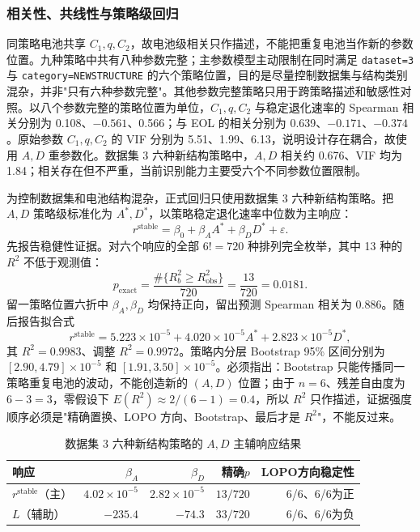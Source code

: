 \documentclass[withoutpreface]{cumcmthesis}
\begin{document}
\subsubsection{相关性、共线性与策略级回归}

同策略电池共享 $C_1,q,C_2$，故电池级相关只作描述，不能把重复电池当作新的参数位置。九种策略中共有八种参数完整；主参数模型主动限制在同时满足 \texttt{dataset=3} 与 \texttt{category=NEWSTRUCTURE} 的六个策略位置，目的是尽量控制数据集与结构类别混杂，并非"只有六种参数完整"。其他参数完整策略只用于跨策略描述和敏感性对照。以八个参数完整的策略位置为单位，$C_1,q,C_2$ 与稳定退化速率的 Spearman 相关分别为 0.108、$-0.561$、0.566；与 EOL 的相关分别为 0.639、$-0.171$、$-0.374$。原始参数 $C_1,q,C_2$ 的 VIF 分别为 5.51、1.99、6.13，说明设计存在耦合，故使用 $A,D$ 重参数化。数据集 3 六种新结构策略中，$A,D$ 相关约 0.676、VIF 均为 1.84；相关存在但不严重，当前识别能力主要受六个不同参数位置限制。

为控制数据集和电池结构混杂，正式回归只使用数据集 3 六种新结构策略。把 $A,D$ 策略级标准化为 $A^*,D^*$，以策略稳定退化速率中位数为主响应：
\begin{equation}
r^{\mathrm{stable}}=\beta_0+\beta_A A^*+\beta_DD^*+\varepsilon.
\end{equation}
先报告稳健性证据。对六个响应的全部 $6!=720$ 种排列完全枚举，其中 13 种的 $R^2$ 不低于观测值：
\begin{equation}
p_{\mathrm{exact}}
=\frac{\#\{R_b^2\ge R_{\mathrm{obs}}^2\}}{720}
=\frac{13}{720}=0.0181.
\end{equation}
留一策略位置六折中 $\beta_A,\beta_D$ 均保持正向，留出预测 Spearman 相关为 0.886。随后报告拟合式
\begin{equation}
\boxed{r^{\mathrm{stable}}
=5.223\times10^{-5}
+4.020\times10^{-5}A^*
+2.823\times10^{-5}D^*},
\end{equation}
其 $R^2=0.9983$、调整 $R^2=0.9972$。策略内分层 Bootstrap 95\% 区间分别为 $[2.90,4.79]\times10^{-5}$ 和 $[1.91,3.50]\times10^{-5}$。必须指出：Bootstrap 只能传播同一策略重复电池的波动，不能创造新的 $(A,D)$ 位置；由于 $n=6$、残差自由度为 $6-3=3$，零假设下 $E(R^2)\approx2/(6-1)=0.4$，所以 $R^2$ 只作描述，证据强度顺序必须是"精确置换、LOPO 方向、Bootstrap、最后才是 $R^2$"，不能反过来。

\begin{table}[H]
\centering
\caption{数据集 3 六种新结构策略的 $A,D$ 主辅响应结果}
\begin{tabular}{lrrrr}
\toprule
响应 & $\beta_A$ & $\beta_D$ & 精确$p$ & LOPO方向稳定性 \\
\midrule
$r^{\mathrm{stable}}$（主） & $4.02\times10^{-5}$ & $2.82\times10^{-5}$ & $13/720$ & 6/6、6/6为正 \\
$L$（辅助） & $-235.4$ & $-74.3$ & $33/720$ & 6/6、6/6为负 \\
\bottomrule
\end{tabular}
\label{tab:q2reg}
\end{table}
\end{document}

